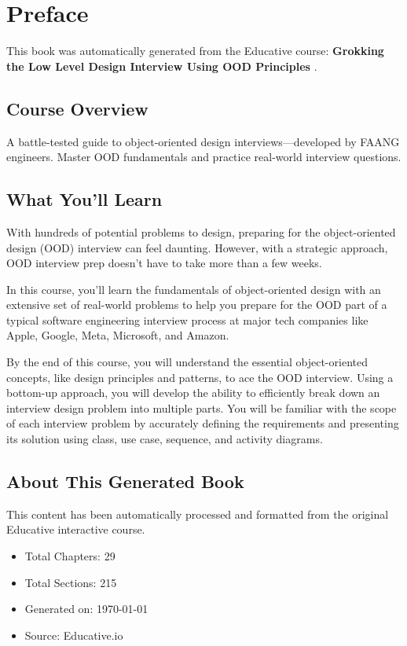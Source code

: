 \documentclass[../main.tex]{subfiles}
\begin{document}
\chapter*{Preface}

This book was automatically generated from the Educative course: \textbf{ Grokking the Low Level Design Interview Using OOD Principles }.

\section*{Course Overview}
A battle-tested guide to object-oriented design interviews—developed by FAANG engineers. Master OOD fundamentals and practice real-world interview questions.

\section*{What You'll Learn}
With hundreds of potential problems to design, preparing for the object-oriented design (OOD) interview can feel daunting. However, with a strategic approach, OOD interview prep doesn’t have to take more than a few weeks. 

In this course, you’ll learn the fundamentals of object-oriented design with an extensive set of real-world problems to help you prepare for the OOD part of a typical software engineering interview process at major tech companies like Apple, Google, Meta, Microsoft, and Amazon.

By the end of this course, you will understand the essential object-oriented concepts, like design principles and patterns, to ace the OOD interview. Using a bottom-up approach, you will develop the ability to efficiently break down an interview design problem into multiple parts. You will be familiar with the scope of each interview problem by accurately defining the requirements and presenting its solution using class, use case, sequence, and activity diagrams.

\section*{About This Generated Book}
This content has been automatically processed and formatted from the original Educative interactive course. 

\begin{itemize}
    \item Total Chapters: 29
    \item Total Sections: 215
    \item Generated on: \today
    \item Source: Educative.io
\end{itemize}
\end{document}

